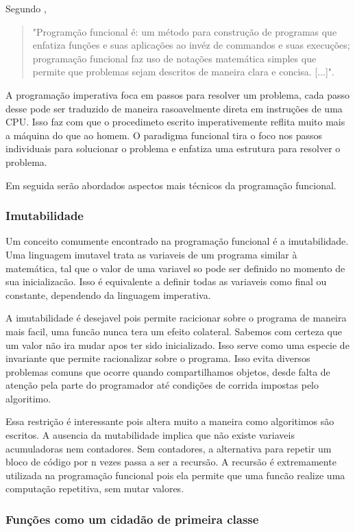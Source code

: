 Segundo \cite{Bird},
\begin{quotation}
"Programção funcional é: um método para construção de programas que enfatiza funções e suas aplicações ao invéz de commandos e suas execuções; programação funcional faz uso de notações matemática simples que permite que problemas sejam descritos de maneira clara e concisa. [...]".
\end{quotation}
A programação imperativa foca em passos para resolver um problema, cada passo desse pode ser traduzido de maneira rasoavelmente direta em instruções de uma CPU.
Isso faz com que o procedimeto escrito imperativemente reflita muito mais a máquina do que ao homem.
O paradigma funcional tira o foco nos passos individuais para solucionar o problema e enfatiza uma estrutura para resolver o problema.

Em seguida serão abordados aspectos mais técnicos da programação funcional.

\subsubsection{Imutabilidade}

Um conceito comumente encontrado na programação funcional é a imutabilidade.
Uma linguagem imutavel trata as variaveis de um programa similar à matemática, tal que o valor de uma variavel so pode ser definido no momento de sua inicializacão.
Isso é equivalente a definir todas as variaveis como final ou constante, dependendo da linguagem imperativa.

A imutabilidade é desejavel pois permite racicionar sobre o programa de maneira mais facil, uma funcão nunca tera um efeito colateral.
Sabemos com certeza que um valor não ira mudar apos ter sido inicializado.
Isso serve como uma especie de invariante que permite racionalizar sobre o programa.
Isso evita diversos problemas comuns que ocorre quando compartilhamos objetos, desde falta de atenção pela parte do programador até condições de corrida impostas pelo algoritimo.

Essa restrição é interessante pois altera muito a maneira como algoritimos são escritos.
A ausencia da mutabilidade implica que não existe variaveis acumuladoras nem contadores.
Sem contadores, a alternativa para repetir um bloco de código por n vezes passa a ser a recursão.
A recursão é extremamente utilizada na programação funcional pois ela permite que uma funcão realize uma computação repetitiva, sem mutar valores.

\subsubsection{Funções como um cidadão de primeira classe}

